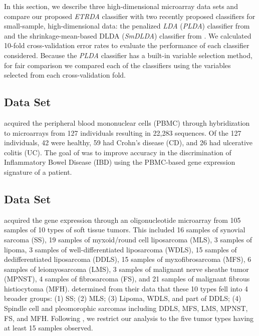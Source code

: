 \documentclass[11pt]{article}
\begin{document}
In this section, we describe three high-dimensional microarray data sets and compare our proposed \emph{ETRDA} classifier with two recently proposed classifiers for small-sample, high-dimensional data: the penalized \emph{LDA} (\emph{PLDA}) classifier from \cite{Witten:2011kc}  and the shrinkage-mean-based DLDA (\emph{SmDLDA}) classifier from \cite{Tong:2012hw}. We calculated 10-fold cross-validation error rates \citep{Hastie:2008dt} to evaluate the performance of each classifier considered. Because the \emph{PLDA} classifier has a built-in variable selection method, for fair comparison we compared each of the classifiers using the variables selected from each cross-validation fold.

\subsection{\cite{Burczynski:2006ik} Data Set}

\cite{Burczynski:2006ik} acquired the peripheral blood mononuclear cells (PBMC) through hybridization to microarrays from 127 individuals resulting in 22,283 sequences. Of the 127 individuals, 42 were healthy, 59 had Crohn's disease (CD), and 26 had ulcerative colitis (UC). The goal of \cite{Burczynski:2006ik} was to improve accuracy in the discrimination of Inflammatory Bowel Disease (IBD) using the PBMC-based gene expression signature of a patient.

\subsection{\cite{Nakayama:2007fl} Data Set}

\cite{Nakayama:2007fl} acquired the gene expression through an oligonucleotide microarray from 105 samples of 10 types of soft tissue tumors. This included 16 samples of synovial sarcoma (SS), 19 samples of myxoid/round cell liposarcoma (MLS), 3 samples of lipoma, 3 samples of well-differentiated liposarcoma (WDLS), 15 samples of dedifferentiated liposarcoma (DDLS), 15 samples of myxofibrosarcoma (MFS), 6 samples of leiomyosarcoma (LMS), 3 samples of malignant nerve sheathe tumor (MPNST), 4 samples of fibrosarcoma (FS), and 21 samples of malignant fibrous histiocytoma (MFH). \cite{Nakayama:2007fl} determined from their data that these 10 types fell into 4 broader groups: (1) SS; (2) MLS; (3) Lipoma, WDLS, and part of DDLS; (4) Spindle cell and pleomorophic sarcomas including DDLS, MFS, LMS, MPNST, FS, and MFH. Following \cite{Witten:2011kc}, we restrict our analysis to the five tumor types having at least 15 samples observed.
\end{document}
